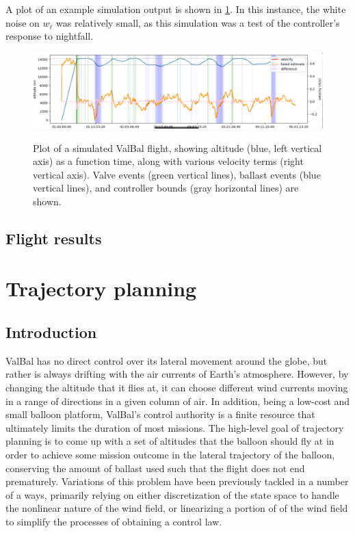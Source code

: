 \documentclass[11pt]{scrartcl} %
\begin{document}
A plot of an example simulation output is shown in \ref{lsim}. In this instance, the white noise on $w_{\dot \ell}$ was relatively small, as this simulation was a test of the controller's response to nightfall.
\begin{figure}[h]
\includegraphics[width=1\linewidth]{lsim.png}
\label{lsim}
\caption{Plot of a simulated ValBal flight, showing altitude (blue, left vertical axis) as a function time, along with various velocity terms (right vertical axis). Valve events (green vertical lines), ballast events (blue vertical lines), and controller bounds (gray horizontal lines) are shown.}
\end{figure}

\subsection{Flight results}

\newpage
\section{Trajectory planning}
\label{TP}

\subsection{Introduction}


ValBal has no direct control over its lateral movement around the globe, but rather is always drifting with the air currents of Earth's atmosphere. However, by changing the altitude that it flies at, it can choose different wind currents moving in a range of directions in a given column of air. In addition, being a low-cost and small balloon platform, ValBal's control authority is a finite resource that ultimately limits the duration of most missions. The high-level goal of trajectory planning is to come up with a set of altitudes that the balloon should fly at in order to achieve some mission outcome in the lateral trajectory of the balloon, conserving the amount of ballast used such that the flight does not end prematurely. Variations of this problem have been previously tackled in a number of a ways, primarily relying on either discretization of the state space to handle the nonlinear nature of the wind field, or linearizing a portion of of the wind field to simplify the processes of obtaining a control law. 
\end{document}
